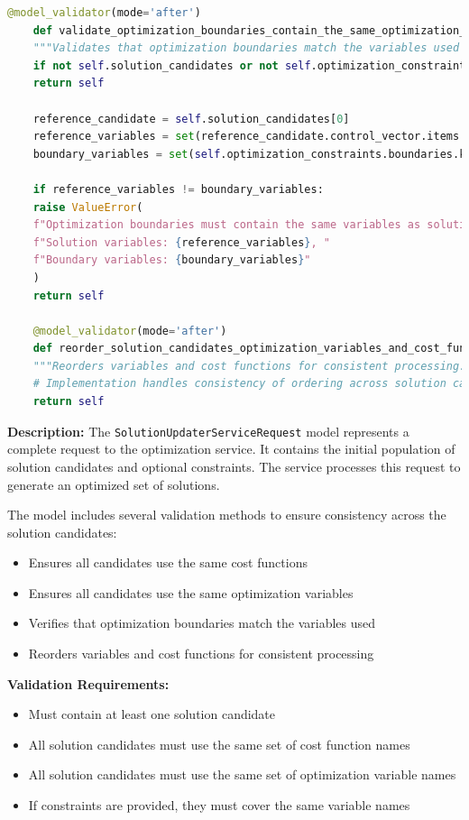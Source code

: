 \begin{lstlisting}[language=Python, caption={SolutionUpdaterServiceRequest model with complex validation logic}]
	@model_validator(mode='after')
	def validate_optimization_boundaries_contain_the_same_optimization_variables(self) -> 'SolutionUpdaterServiceRequest':
	"""Validates that optimization boundaries match the variables used in solutions."""
	if not self.solution_candidates or not self.optimization_constraints:
	return self

	reference_candidate = self.solution_candidates[0]
	reference_variables = set(reference_candidate.control_vector.items.keys())
	boundary_variables = set(self.optimization_constraints.boundaries.keys())

	if reference_variables != boundary_variables:
	raise ValueError(
	f"Optimization boundaries must contain the same variables as solution candidates. "
	f"Solution variables: {reference_variables}, "
	f"Boundary variables: {boundary_variables}"
	)
	return self

	@model_validator(mode='after')
	def reorder_solution_candidates_optimization_variables_and_cost_functions(self) -> 'SolutionUpdaterServiceRequest':
	"""Reorders variables and cost functions for consistent processing."""
	# Implementation handles consistency of ordering across solution candidates
	return self
\end{lstlisting}

\textbf{Description:}
The \texttt{SolutionUpdaterServiceRequest} model represents a complete request to the optimization service. It contains the initial population of solution candidates and optional constraints. The service processes this request to generate an optimized set of solutions.

The model includes several validation methods to ensure consistency across the solution candidates:
\begin{itemize}
	\item Ensures all candidates use the same cost functions
	\item Ensures all candidates use the same optimization variables
	\item Verifies that optimization boundaries match the variables used
	\item Reorders variables and cost functions for consistent processing
\end{itemize}

\textbf{Validation Requirements:}
\begin{itemize}
	\item Must contain at least one solution candidate
	\item All solution candidates must use the same set of cost function names
	\item All solution candidates must use the same set of optimization variable names
	\item If constraints are provided, they must cover the same variable names
\end{itemize}







